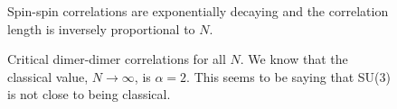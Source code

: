 \documentclass{article}
\begin{document}
%
\begin{figure}[h]
	\begin{center}
	\end{center}
	\caption{Spin-spin correlations are exponentially decaying and the correlation length is inversely proportional to $N$.}
	\label{fig:dimer64}
\end{figure}
%
%
\begin{figure}[h]
	\begin{center}
	\end{center}
	\caption{Critical dimer-dimer correlations for all $N$. We know that the classical value, $N \to \infty$, is $\alpha = 2$. This seems to be saying that SU(3) is not 
			close to being classical.}
	\label{fig:dimer64}
\end{figure}
\end{document}
